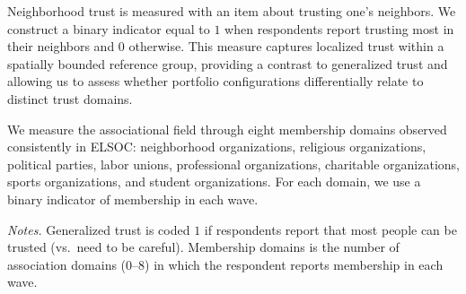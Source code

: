 Neighborhood trust is measured with an item about trusting one's neighbors. We construct a binary indicator equal to $1$ when respondents report trusting most in their neighbors and $0$ otherwise. This measure captures localized trust within a spatially bounded reference group, providing a contrast to generalized trust and allowing us to assess whether portfolio configurations differentially relate to distinct trust domains.

We measure the associational field through eight membership domains observed consistently in ELSOC: neighborhood organizations, religious organizations, political parties, labor unions, professional organizations, charitable organizations, sports organizations, and student organizations. For each domain, we use a binary indicator of membership in each wave.

\begin{table}[!htbp]
\centering
\caption{Summary Statistics}
\label{table:summary_stats}
\vspace{0.25em}
\begin{flushleft}
\footnotesize \emph{Notes.} Generalized trust is coded $1$ if respondents report that most people can be trusted (vs.\ need to be careful). Membership domains is the number of association domains (0--8) in which the respondent reports membership in each wave.
\end{flushleft}
\end{table}



